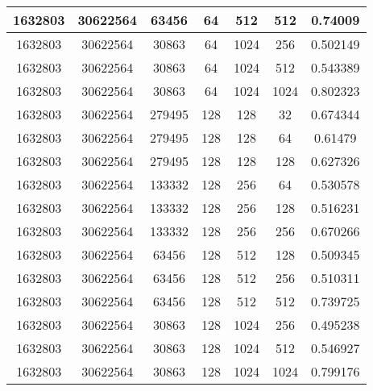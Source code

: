 \documentclass[9pt]{article}
\begin{document}
\begin{tabular}{|c|c|c|c|c|c|c| }
\hline
1632803  & 30622564  & 63456  & 64  & 512  & 512  & 0.74009 \\
\hline
1632803  & 30622564  & 30863  & 64  & 1024  & 256  & 0.502149 \\
\hline
1632803  & 30622564  & 30863  & 64  & 1024  & 512  & 0.543389 \\
\hline
1632803  & 30622564  & 30863  & 64  & 1024  & 1024  & 0.802323 \\
\hline
1632803  & 30622564  & 279495  & 128  & 128  & 32  & 0.674344 \\
\hline
1632803  & 30622564  & 279495  & 128  & 128  & 64  & 0.61479 \\
\hline
1632803  & 30622564  & 279495  & 128  & 128  & 128  & 0.627326 \\
\hline
1632803  & 30622564  & 133332  & 128  & 256  & 64  & 0.530578 \\
\hline
1632803  & 30622564  & 133332  & 128  & 256  & 128  & 0.516231 \\
\hline
1632803  & 30622564  & 133332  & 128  & 256  & 256  & 0.670266 \\
\hline
1632803  & 30622564  & 63456  & 128  & 512  & 128  & 0.509345 \\
\hline
1632803  & 30622564  & 63456  & 128  & 512  & 256  & 0.510311 \\
\hline
1632803  & 30622564  & 63456  & 128  & 512  & 512  & 0.739725 \\
\hline
1632803  & 30622564  & 30863  & 128  & 1024  & 256  & 0.495238 \\
\hline
1632803  & 30622564  & 30863  & 128  & 1024  & 512  & 0.546927 \\
\hline
1632803  & 30622564  & 30863  & 128  & 1024  & 1024  & 0.799176 \\
\hline
\end{tabular}
 
\end{document}
